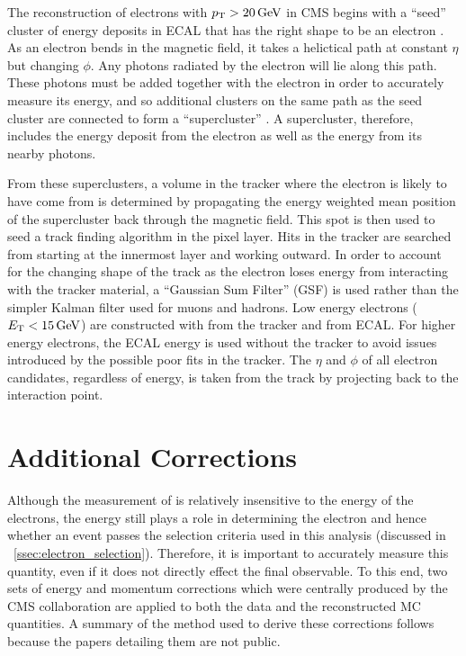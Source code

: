 The reconstruction of electrons with $p_{\mathrm{T}} > 20 \,\text{Ge\hspace{-.08em}V}$ in CMS begins with a
``seed'' cluster of energy deposits in ECAL that has the right shape to be an
electron \cite{eg_reco_2010}. As an electron bends in the magnetic field, it
takes a helictical path at constant $\eta$ but changing $\phi$. Any photons
radiated by the electron will lie along this path. These photons must be added
together with the electron in order to accurately measure its energy, and so
additional clusters on the same path as the seed cluster are connected to form
a ``supercluster'' \cite{baffioni_2007}. A supercluster, therefore, includes
the energy deposit from the electron as well as the energy from its nearby
photons.

From these superclusters, a volume in the tracker where the electron is likely
to have come from is determined by propagating the energy weighted mean
position of the supercluster back through the magnetic field. This spot is then
used to seed a track finding algorithm in the pixel layer. Hits in the tracker
are searched from starting at the innermost layer and working outward. In order
to account for the changing shape of the track as the electron loses energy
from interacting with the tracker material, a ``Gaussian Sum Filter'' (GSF)
\cite{adam_2005} is used rather than the simpler Kalman filter used for muons
and hadrons. Low energy electrons ($E_{\mathrm{T}} < 15 \,\text{Ge\hspace{-.08em}V}$) are constructed with \pt
from the tracker and \ET from ECAL. For higher energy electrons, the ECAL
energy is used without the tracker \pt to avoid issues introduced by the
possible poor fits in the tracker. The $\eta$ and $\phi$ of all electron
candidates, regardless of energy, is taken from the track by projecting back to
the interaction point.

\section{Additional Corrections}

Although the measurement of \phistar is relatively insensitive to the energy of
the electrons, the energy still plays a role in determining the electron \pt
and hence whether an event passes the selection criteria used in this analysis
(discussed in \SEC~\ref{ssec:electron_selection}). Therefore, it is important
to accurately measure this quantity, even if it does not directly effect the
final observable. To this end, two sets of energy and momentum corrections
which were centrally produced by the CMS collaboration are applied to both the
data and the reconstructed MC quantities. A summary of the method used to
derive these corrections follows because the papers detailing them are not
public.

